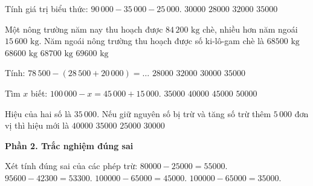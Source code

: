 \begin{ex} %
Tính giá trị biểu thức: $90\,000 - 35\,000 - 25\,000$.
\choice
{\True $30000$}
{$28000$}
{$32000$}
{$35000$}
\end{ex}

\begin{ex} %
Một nông trường năm nay thu hoạch được $84\,200\text{ kg}$ chè, nhiều hơn năm ngoái $15\,600\text{ kg}$. Năm ngoái nông trường thu hoạch được số ki-lô-gam chè là
\choice
{$68500\text{ kg}$}
{\True $68600\text{ kg}$}
{$68700\text{ kg}$}
{$69600\text{ kg}$}
\end{ex}

\begin{ex} %
Tính: $78\,500 - (28\,500 + 20\,000) = \dots$
\choice
{$28000$}
{$32000$}
{\True $30000$}
{$35000$}
\end{ex}

\begin{ex} %
Tìm $x$ biết: $100\,000 - x = 45\,000 + 15\,000$.
\choice
{$35000$}
{\True $40000$}
{$45000$}
{$50000$}
\end{ex}

\begin{ex} %
Hiệu của hai số là $35\,000$. Nếu giữ nguyên số bị trừ và tăng số trừ thêm $5\,000$ đơn vị thì hiệu mới là
\choice
{$40000$}
{$35000$}
{$25000$}
{\True $30000$}
\end{ex}

\textbf{Phần 2. Trắc nghiệm đúng sai}

\begin{ex} %
Xét tính đúng sai của các phép trừ:
\choiceTF
{\True $80000 - 25000 = 55000$.}
{\True $95600 - 42300 = 53300$.}
{$100000 - 65000 = 45000$.}
{\True $100000 - 65000 = 35000$.}
\end{ex}


